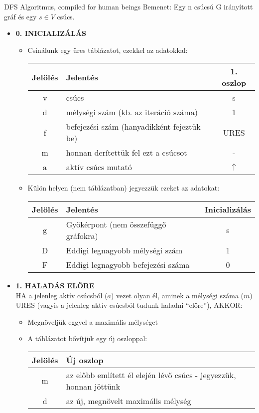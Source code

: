 \begin{tetel}{DFS Algoritmus, compiled for human beings}
Bemenet: Egy n csúcsú G irányított gráf és egy $s \in V$ csúcs.
\begin{itemize}
\item{\textbf{0. INICIALIZÁLÁS}}
  \begin{itemize}
  \item Csinálunk egy üres táblázatot, ezekkel az adatokkal:\\
    
    \begin{tabular}{c l c}
      Jelölés & Jelentés & 1. oszlop\\
      \hline
      v & csúcs & s\\
      d & mélységi szám (kb. az iteráció száma) & 1\\
      f & befejezési szám (hanyadikként fejeztük be) & URES\\
      m & honnan derítettük fel ezt a csúcsot & -\\
      a & aktív csúcs mutató & $\uparrow$\\
    \end{tabular}

  \item Külön helyen (nem táblázatban) jegyezzük ezeket az adatokat:\\
    
    \begin{tabular}{c l c}
      Jelölés & Jelentés & Inicializálás\\
      \hline
      g & Gyökérpont (nem összefüggő gráfokra) & s\\
      D & Eddigi legnagyobb mélységi szám& 1\\
      F & Eddigi legnagyobb befejezési száma& 0\\
    \end{tabular}
  \end{itemize}
\item{\textbf{1. HALADÁS ELŐRE}}
  \\
  HA a jelenleg aktív csúcsból ($a$) vezet olyan él, aminek a mélységi száma ($m$) URES (vagyis a jelenleg aktív csúcsból tudunk haladni ``előre''), AKKOR:
  \begin{itemize}
  \item Megnöveljük eggyel a maximális mélységet
  \item A táblázatot bővítjük egy új oszloppal:\\

    \begin{tabular}{c l}
      Jelölés & Új oszlop\\
      \hline
      m & az előbb említett él elején lévő csúcs - jegyezzük, honnan jöttünk\\
      d & az új, megnövelt maximális mélység\\
    \end{tabular}


\end{itemize}
\end{itemize}
\end{tetel}
